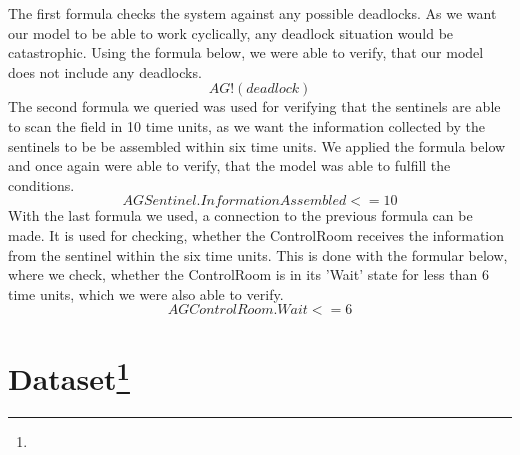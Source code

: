 \documentclass[english]{lni}
\begin{document}
The first formula checks the system against any possible deadlocks. As we want our model to be able to work cyclically, any deadlock situation would  be catastrophic. Using the formula below, we were able to verify, that our model does not include any deadlocks.
\begin{equation}
AG !(deadlock)\label{eq1}
\end{equation}
The second formula we queried was used for verifying that the sentinels are able to scan the field in 10 time units, as we want the information collected by the sentinels to be be assembled within six time units. We applied the formula below and once again were able to verify, that the model was able to fulfill the conditions.
\begin{equation}
AG Sentinel.InformationAssembled <= 10\label{eq2}
\end{equation}
With the last formula we used, a connection to the previous formula can be made. It is used for checking, whether the ControlRoom receives the information from the sentinel within the six time units. This is done with the formular below, where we check, whether the ControlRoom is in its 'Wait' state for less than 6 time units, which we were also able to verify.
\begin{equation}
AG ControlRoom.Wait <= 6\label{eq3}
\end{equation}









\newpage
\section[Dataset]{Dataset\protect\footnote{ }}\label{sec:dataset}
\end{document}
